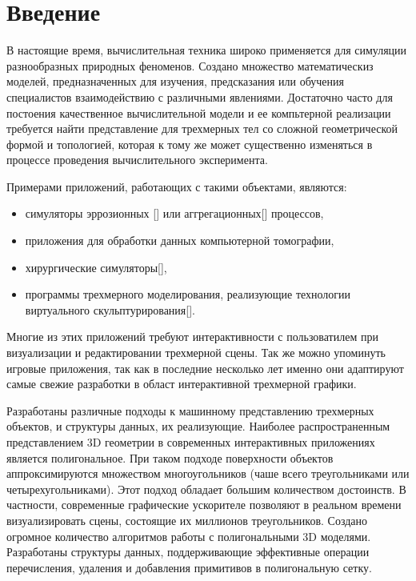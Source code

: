 \chapter*{Введение}

В настоящие время, вычислительная техника широко применяется для симуляции разнообразных природных феноменов. Создано множество математическиз моделей, предназначенных для изучения, предсказания или обучения специалистов взаимодействию с различными явлениями. Достаточно часто для постоения качественное вычислительной модели и ее компьтерной реализации требуется найти представление для трехмерных тел со сложной геометрической формой и топологией, которая к тому же может существенно изменяться в процессе проведения вычислительного эксперимента.

Примерами приложений, работающих с такими объектами, являются:
\begin{itemize}
\item симуляторы эррозионных [] или аггрегационных[] процессов,
\item приложения для обработки данных компьютерной томографии,
\item хирургические симуляторы[],
\item программы трехмерного моделирования, реализующие технологии виртуального скульптурирования[].
\end{itemize}

Многие из этих приложений требуют интерактивности с пользоватилем при визуализации и редактировании трехмерной сцены. Так же можно упоминуть игровые приложения, так как в последние несколько лет именно они адаптируют самые свежие разработки в област интерактивной трехмерной графики.

Разработаны различные подходы к машинному представлению трехмерных объектов, и структуры данных, их реализующие. Наиболее распространенным представлением 3D геометрии в современных интерактивных приложениях является полигональное. При таком подходе поверхности объектов аппроксимируются множеством многоугольников (чаше всего треугольниками или четырехугольниками). Этот подход обладает большим количеством достоинств. В частности, современные графические ускорителе позволяют в реальном времени визуализировать сцены, состоящие их миллионов треугольников. Создано огромное количество алгоритмов работы с полигональными 3D моделями. Разработаны структуры данных, поддерживающие эффективные операции перечисления, удаления и добавления примитивов в полигональную сетку.

